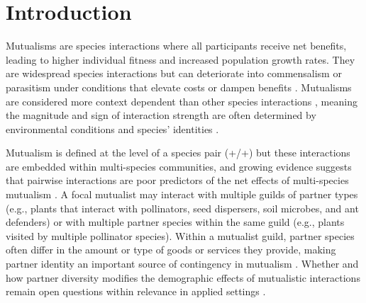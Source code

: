\documentclass[11pt]{article}
\begin{document}
\newpage{}
\section*{Introduction}
Mutualisms are species interactions where all participants receive net benefits, leading to higher individual fitness and increased population growth rates. 
They are widespread species interactions but can deteriorate into commensalism or parasitism under conditions that elevate costs or dampen benefits \citep{Rodriguez-Rodriguez2017,Song2020,Mandyam2014,Thrall2007, Bahia2022,Bronstein1994,Chamberlain2014,Frederickson2013,Axelrod1981,Leigh2010}.
Mutualisms are considered more context dependent than other species interactions \citep{Chamberlain2014,Frederickson2013}, meaning the magnitude and sign of interaction strength are often determined by environmental conditions and species' identities \citep{Noe1994,Leigh2010}.

Mutualism is defined at the level of a species pair (+/+) but these interactions are embedded within multi-species communities, and growing evidence suggests that pairwise interactions are poor predictors of the net effects of multi-species mutualism \citep{Afkhami2014,Palmer2010,Bascompte2009,Dattilo2014}. 
A focal mutualist may interact with multiple guilds of partner types (e.g., plants that interact with pollinators, seed dispersers, soil microbes, and ant defenders) or with multiple partner species within the same guild (e.g., plants visited by multiple pollinator species). 
Within a mutualist guild, partner species often differ in the amount or type of goods or services they provide, making partner identity an important source of contingency in mutualism \citep{Stanton2003}. 
Whether and how partner diversity modifies the demographic effects of mutualistic interactions remain open questions within relevance in applied settings \citep{rogers2014, Thibaut2012, Frederickson2005, Palmer2010}.
\end{document}
